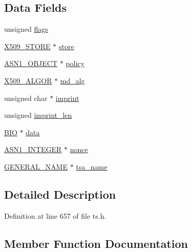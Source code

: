 \subsection*{Data Fields}
\begin{DoxyCompactItemize}
\item 
unsigned \hyperlink{struct_t_s__verify__ctx_a8b08a4d2ec878257d64c55f64a62242c}{flags}
\item 
\hyperlink{crypto_2ossl__typ_8h_a3a2b800bae08729d11bc28f12b795597}{X509\+\_\+\+S\+T\+O\+RE} $\ast$ \hyperlink{struct_t_s__verify__ctx_a2402ee2e48f109a9aa0cc9d06010cc11}{store}
\item 
\hyperlink{crypto_2ossl__typ_8h_ae3fda0801e4c8e250087052bafb3ce2e}{A\+S\+N1\+\_\+\+O\+B\+J\+E\+CT} $\ast$ \hyperlink{struct_t_s__verify__ctx_a8eb85d267e5ad96cbe580907a58d941e}{policy}
\item 
\hyperlink{crypto_2ossl__typ_8h_aa2b6185e6254f36f709cd6577fb5022e}{X509\+\_\+\+A\+L\+G\+OR} $\ast$ \hyperlink{struct_t_s__verify__ctx_a05ef2b9fa427a09bab28a58ae8659374}{md\+\_\+alg}
\item 
unsigned char $\ast$ \hyperlink{struct_t_s__verify__ctx_a1c944cd19ab4c309eeb8a60635c0056a}{imprint}
\item 
unsigned \hyperlink{struct_t_s__verify__ctx_a91f6c4a3e282c088e87f5ea5e77940dd}{imprint\+\_\+len}
\item 
\hyperlink{crypto_2bio_2bio_8h_af3fabae1c9af50b9312cdff41e11d1dd}{B\+IO} $\ast$ \hyperlink{struct_t_s__verify__ctx_a90339a8d7ad115b5e698d4d16516fc6a}{data}
\item 
\hyperlink{crypto_2ossl__typ_8h_af4335399bf9774cb410a5e93de65998b}{A\+S\+N1\+\_\+\+I\+N\+T\+E\+G\+ER} $\ast$ \hyperlink{struct_t_s__verify__ctx_a8b13ecb2aac904e4547773630a3b51e6}{nonce}
\item 
\hyperlink{crypto_2x509v3_2x509v3_8h_a6688fb8a0c7b8e63f3d47bac3a09eb15}{G\+E\+N\+E\+R\+A\+L\+\_\+\+N\+A\+ME} $\ast$ \hyperlink{struct_t_s__verify__ctx_ae635e139260d4467cf706759a9a4bcdb}{tsa\+\_\+name}
\end{DoxyCompactItemize}


\subsection{Detailed Description}


Definition at line 657 of file ts.\+h.



\subsection{Member Function Documentation}
